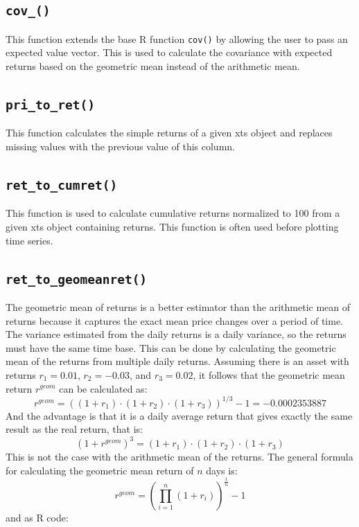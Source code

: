 \documentclass[
  oneside]{book}
\begin{document}
\hypertarget{covfun}{%
\subsection{\texorpdfstring{\texttt{cov\_()}}{cov\_()}}\label{covfun}}

This function extends the base R function \texttt{cov()} by allowing the user to pass an expected value vector. This is used to calculate the covariance with expected returns based on the geometric mean instead of the arithmetic mean.

\hypertarget{pritoret}{%
\subsection{\texorpdfstring{\texttt{pri\_to\_ret()}}{pri\_to\_ret()}}\label{pritoret}}

This function calculates the simple returns of a given xts object and replaces missing values with the previous value of this column.

\hypertarget{ret_to_cumret}{%
\subsection{\texorpdfstring{\texttt{ret\_to\_cumret()}}{ret\_to\_cumret()}}\label{ret_to_cumret}}

This function is used to calculate cumulative returns normalized to 100 from a given xts object containing returns. This function is often used before plotting time series.

\hypertarget{geomeanret}{%
\subsection{\texorpdfstring{\texttt{ret\_to\_geomeanret()}}{ret\_to\_geomeanret()}}\label{geomeanret}}

The geometric mean of returns is a better estimator than the arithmetic mean of returns because it captures the exact mean price changes over a period of time. The variance estimated from the daily returns is a daily variance, so the returns must have the same time base. This can be done by calculating the geometric mean of the returns from multiple daily returns. Assuming there is an asset with returns \(r_1 = 0.01\), \(r_2=-0.03\), and \(r_3=0.02\), it follows that the geometric mean return \(r^{geom}\) can be calculated as:
\[
  r^{geom} = ((1+r_1) \cdot (1+r_2) \cdot (1+r_3))^{1/3}-1 = -0.0002353887
\]
And the advantage is that it is a daily average return that gives exactly the same result as the real return, that is:
\[
  (1+r^{geom})^3 = (1+r_1) \cdot (1+r_2) \cdot (1+r_3)
\]
This is not the case with the arithmetic mean of the returns. The general formula for calculating the geometric mean return of \(n\) days is:
\[
  r^{geom} = (\prod_{i=1}^n (1+r_i))^{\frac{1}{n}}-1
\]
and as R code:
\end{document}
